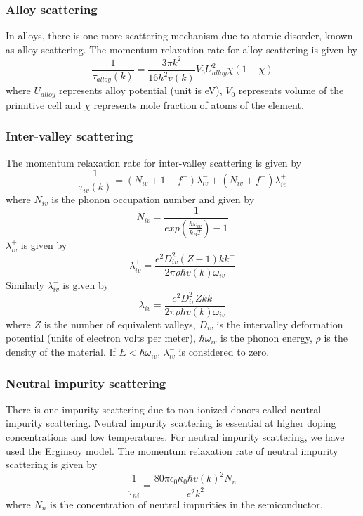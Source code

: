 \documentclass[12pt]{article}
\begin{document}
\subsubsection{Alloy scattering}

In alloys, there is one more scattering mechanism due to atomic disorder, known as alloy scattering. The momentum relaxation rate for alloy scattering is given by \cite{ramu2010rigorous}
\begin{equation}
\frac{1}{\tau_{alloy}(k)} = \frac{3 \pi k^2}{16 \hbar^2 v(k)} V_0 U_{alloy}^2 \chi (1-\chi)
\label{alloy}
\end{equation}
where $U_{alloy}$ represents alloy potential (unit is eV), $V_0$ represents volume of the primitive cell and $\chi$ represents mole fraction of atoms of the element.


\subsubsection{Inter-valley scattering}

The momentum relaxation rate for inter-valley scattering is given by \cite{rode3}
\begin{equation}
\frac{1}{\tau_{iv}(k)} = (N_{iv} + 1 - f^-) \lambda_{iv}^- + (N_{iv} + f^+) \lambda_{iv}^+ 
\label{iv}
\end{equation}
where $N_{iv}$ is the phonon occupation number and given by
\begin{equation}
N_{iv} = \frac{1}{exp(\frac{\hbar \omega_{iv}}{k_B T})-1} 
\label{N_iv}
\end{equation}  
$\lambda_{iv}^+$ is given by
\begin{equation}
\lambda_{iv}^+ = \frac{e^2D_{iv}^2(Z-1)kk^+}{2 \pi \rho \hbar v(k) \omega_{iv}} 
\label{lambda_iv_pos}
\end{equation}  
Similarly $\lambda_{iv}^-$ is given by
\begin{equation}
\lambda_{iv}^- = \frac{e^2D_{iv}^2 Z kk^-}{2 \pi \rho \hbar v(k) \omega_{iv}} 
\label{lambda_iv_neg}
\end{equation}  
where $Z$ is the number of equivalent valleys, $D_{iv}$ is the intervalley deformation potential (units of electron volts per meter), $\hbar \omega_{iv}$ is the phonon energy, $\rho$ is the density of the material. If $E < \hbar \omega_{iv}$,  $\lambda_{iv}^-$ is considered to zero.\\ 


\subsubsection{Neutral impurity scattering}
There is one impurity scattering due to non-ionized donors called neutral impurity scattering. Neutral impurity scattering is essential at higher doping concentrations and low temperatures. For neutral impurity scattering, we have used the Erginsoy model\cite{erginsoy}. The momentum relaxation rate of neutral impurity scattering is given by
\begin{equation}
\frac{1}{\tau_{ni}} = \frac{80 \pi \epsilon_0 \kappa_0 \hbar v(k)^2 N_n}{e^2 k^2}
\label{neutral_impurity}
\end{equation}  
where $N_n$ is the concentration of neutral impurities in the semiconductor.  
\end{document}
